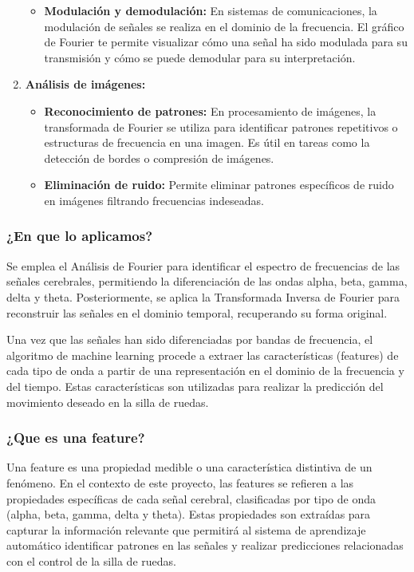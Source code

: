 \documentclass{article}
\begin{document}
\begin{enumerate}
\begin{itemize}
        \item \textbf{Modulación y demodulación:} En sistemas de comunicaciones, la modulación de señales se realiza en el dominio de la frecuencia. El gráfico de Fourier te permite visualizar cómo una señal ha sido modulada para su transmisión y cómo se puede demodular para su interpretación.
    \end{itemize}
    \newpage
    \item \textbf{Análisis de imágenes:}
    \begin{itemize}
        \item \textbf{Reconocimiento de patrones:} En procesamiento de imágenes, la transformada de Fourier se utiliza para identificar patrones repetitivos o estructuras de frecuencia en una imagen. Es útil en tareas como la detección de bordes o compresión de imágenes.
    
        \item \textbf{Eliminación de ruido:} Permite eliminar patrones específicos de ruido en imágenes filtrando frecuencias indeseadas.
    \end{itemize}
\end{enumerate}

\subsubsection{¿En que lo aplicamos?}

Se emplea el Análisis de Fourier para identificar el espectro de frecuencias de las señales cerebrales, permitiendo la diferenciación de las ondas alpha, beta, gamma, delta y theta. Posteriormente, se aplica la Transformada Inversa de Fourier para reconstruir las señales en el dominio temporal, recuperando su forma original.

Una vez que las señales han sido diferenciadas por bandas de frecuencia, el algoritmo de machine learning procede a extraer las características (features) de cada tipo de onda a partir de una representación en el dominio de la frecuencia y del tiempo. Estas características son utilizadas para realizar la predicción del movimiento deseado en la silla de ruedas.

\subsubsection{¿Que es una feature?}

Una feature es una propiedad medible o una característica distintiva de un fenómeno. En el contexto de este proyecto, las features se refieren a las propiedades específicas de cada señal cerebral, clasificadas por tipo de onda (alpha, beta, gamma, delta y theta). Estas propiedades son extraídas para capturar la información relevante que permitirá al sistema de aprendizaje automático identificar patrones en las señales y realizar predicciones relacionadas con el control de la silla de ruedas.
\end{document}
